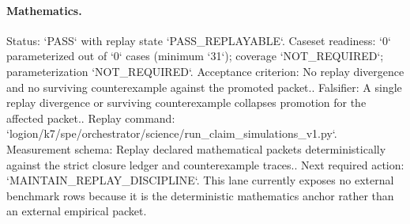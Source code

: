 \paragraph{Mathematics.}
Status: `PASS` with replay state `PASS\_REPLAYABLE`.
Caseset readiness: `0` parameterized out of `0` cases (minimum `31`); coverage `NOT\_REQUIRED`; parameterization `NOT\_REQUIRED`.
Acceptance criterion: No replay divergence and no surviving counterexample against the promoted packet..
Falsifier: A single replay divergence or surviving counterexample collapses promotion for the affected packet..
Replay command: `logion/k7/spe/orchestrator/science/run\_claim\_simulations\_v1.py`.
Measurement schema: Replay declared mathematical packets deterministically against the strict closure ledger and counterexample traces..
Next required action: `MAINTAIN\_REPLAY\_DISCIPLINE`.
This lane currently exposes no external benchmark rows because it is the deterministic mathematics anchor rather than an external empirical packet.

